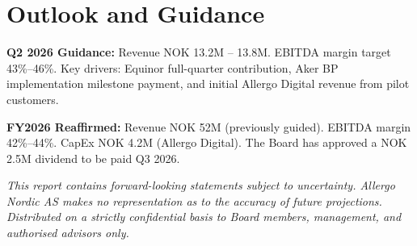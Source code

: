 \documentclass[a4paper,11pt]{article}
\begin{document}
\section{Outlook and Guidance}

\textbf{Q2 2026 Guidance:} Revenue NOK 13.2M -- 13.8M. EBITDA margin target 43\%--46\%.
Key drivers: Equinor full-quarter contribution, Aker BP implementation milestone payment,
and initial Allergo Digital revenue from pilot customers.

\textbf{FY2026 Reaffirmed:} Revenue NOK 52M (previously guided). EBITDA margin 42\%--44\%.
CapEx NOK 4.2M (Allergo Digital). The Board has approved a NOK 2.5M dividend to be paid Q3 2026.

\vspace{16pt}
\noindent\textit{\small This report contains forward-looking statements subject to uncertainty.
Allergo Nordic AS makes no representation as to the accuracy of future projections.
Distributed on a strictly confidential basis to Board members, management, and authorised advisors only.}
\end{document}
